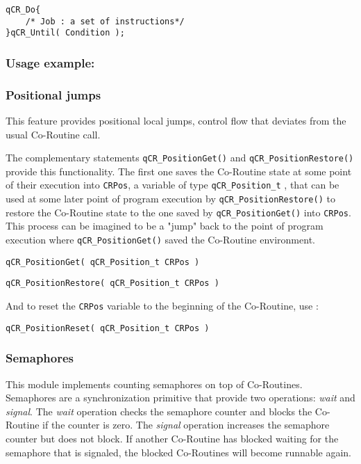 \begin{lstlisting}[style=CStyle]
qCR_Do{
    /* Job : a set of instructions*/
}qCR_Until( Condition );
\end{lstlisting}

\subsubsection*{Usage example:}


\subsubsection{Positional jumps}
This feature provides positional local jumps, control flow that deviates from the usual Co-Routine call. 

The complementary statements \lstinline{qCR_PositionGet()}  and \lstinline{qCR_PositionRestore()}  provide this functionality.
The first one saves the Co-Routine state at some point of their execution into \lstinline{CRPos}, a variable of type \lstinline{qCR_Position_t} ,  that can be used at some later point of program execution by \lstinline{qCR_PositionRestore()} to restore the Co-Routine  state to the one saved by \lstinline{qCR_PositionGet()} into \lstinline{CRPos}. This process can be imagined to be a "jump" back to the point of program execution where \lstinline{qCR_PositionGet()} saved the Co-Routine  environment.
\medskip

\begin{lstlisting}[style=CStyle]
qCR_PositionGet( qCR_Position_t CRPos )
\end{lstlisting}

\begin{lstlisting}[style=CStyle]
qCR_PositionRestore( qCR_Position_t CRPos )
\end{lstlisting}

And to reset the \lstinline{CRPos} variable to the beginning of the Co-Routine, use :

\begin{lstlisting}[style=CStyle]
qCR_PositionReset( qCR_Position_t CRPos )
\end{lstlisting}

\subsubsection{Semaphores}
This module implements counting semaphores on top of Co-Routines. Semaphores are a synchronization primitive that provide two operations: \textit{wait} and \textit{signal}. The \textit{wait} operation checks the semaphore counter and blocks the Co-Routine if the counter is zero. The \textit{signal} operation increases the semaphore counter but does not block. If another Co-Routine has blocked waiting for the semaphore that is signaled, the blocked Co-Routines will become runnable again.

